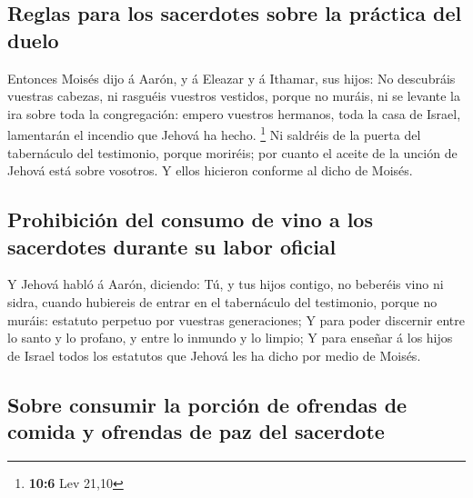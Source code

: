 \hypertarget{reglas-para-los-sacerdotes-sobre-la-pruxe1ctica-del-duelo}{%
\subsection{Reglas para los sacerdotes sobre la práctica del
duelo}\label{reglas-para-los-sacerdotes-sobre-la-pruxe1ctica-del-duelo}}

 Entonces Moisés dijo á Aarón, y á Eleazar y á Ithamar,
sus hijos: No descubráis vuestras cabezas, ni rasguéis vuestros
vestidos, porque no muráis, ni se levante la ira sobre toda la
congregación: empero vuestros hermanos, toda la casa de Israel,
lamentarán el incendio que Jehová ha hecho. \footnote{\textbf{10:6} Lev
  21,10}  Ni saldréis de la puerta del tabernáculo del
testimonio, porque moriréis; por cuanto el aceite de la unción de Jehová
está sobre vosotros. Y ellos hicieron conforme al dicho de Moisés.

\hypertarget{prohibiciuxf3n-del-consumo-de-vino-a-los-sacerdotes-durante-su-labor-oficial}{%
\subsection{Prohibición del consumo de vino a los sacerdotes durante su
labor
oficial}\label{prohibiciuxf3n-del-consumo-de-vino-a-los-sacerdotes-durante-su-labor-oficial}}

 Y Jehová habló á Aarón, diciendo:  Tú, y
tus hijos contigo, no beberéis vino ni sidra, cuando hubiereis de entrar
en el tabernáculo del testimonio, porque no muráis: estatuto perpetuo
por vuestras generaciones;  Y para poder discernir entre
lo santo y lo profano, y entre lo inmundo y lo limpio;  Y
para enseñar á los hijos de Israel todos los estatutos que Jehová les ha
dicho por medio de Moisés.

\hypertarget{sobre-consumir-la-porciuxf3n-de-ofrendas-de-comida-y-ofrendas-de-paz-del-sacerdote}{%
\subsection{Sobre consumir la porción de ofrendas de comida y ofrendas
de paz del
sacerdote}\label{sobre-consumir-la-porciuxf3n-de-ofrendas-de-comida-y-ofrendas-de-paz-del-sacerdote}}

